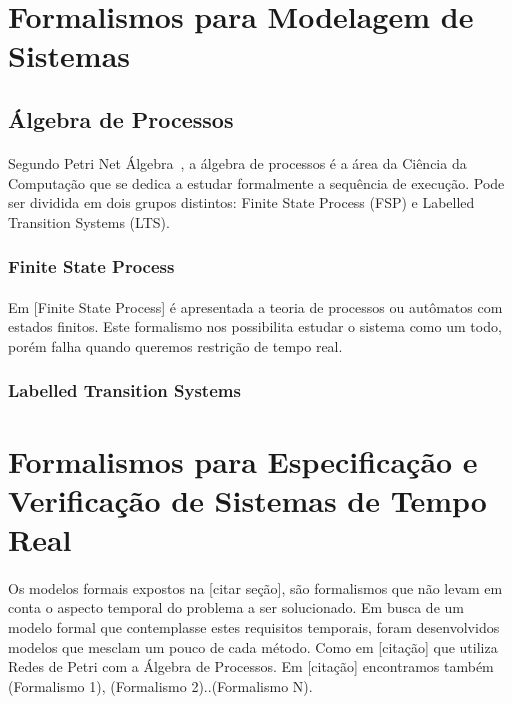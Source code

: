 \section{Formalismos para Modelagem de Sistemas}

\subsection{Álgebra de Processos}
\paragraph{}
Segundo Petri Net Álgebra~\cite{books/daglib/0003970}, a álgebra de processos é a área da Ciência da Computação que se dedica
a estudar formalmente a sequência de execução. Pode ser dividida em dois
grupos distintos: Finite State Process (FSP) e Labelled Transition Systems (LTS).

\subsubsection{Finite State Process}
\paragraph{}
Em [Finite State Process] é apresentada a teoria de processos ou autômatos com estados finitos.
Este formalismo nos possibilita estudar o sistema como um todo, porém falha quando queremos restrição de tempo real.
\subsubsection{Labelled Transition Systems}


\section{Formalismos para Especificação e Verificação de Sistemas de Tempo Real}
\paragraph{}
Os modelos formais expostos na [citar seção], são formalismos que não levam em conta o aspecto temporal do problema
a ser solucionado.
Em busca de um modelo formal que contemplasse estes requisitos temporais, foram desenvolvidos modelos que mesclam
um pouco de cada método. Como em [citação] que utiliza Redes de Petri com a Álgebra de Processos. Em [citação]
encontramos também (Formalismo 1), (Formalismo 2)..(Formalismo N).
